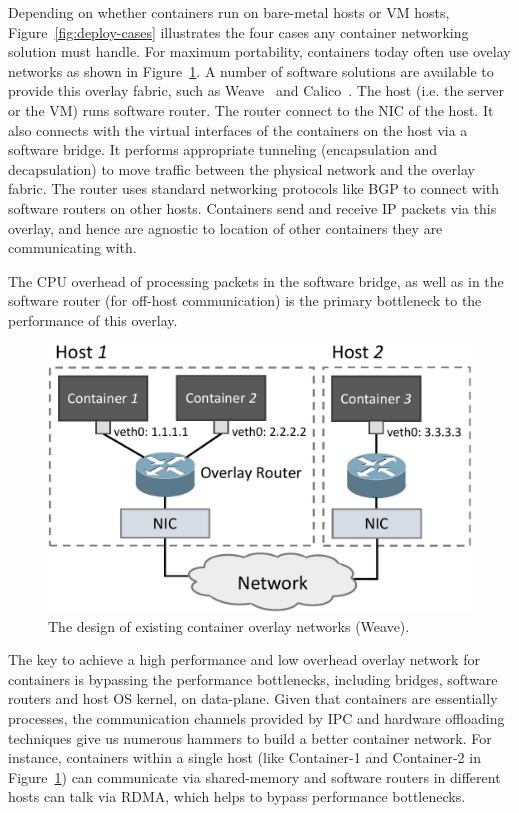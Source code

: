 Depending on whether containers run on bare-metal hosts or VM hosts,
Figure~\ref{fig:deploy-cases} illustrates the four cases any container
networking solution must handle. For maximum portability, containers today often
use ovelay networks as shown in Figure~\ref{fig:overlay}. A number of software
solutions are available to provide this overlay fabric, such as 
Weave~\cite{wave} and Calico~\cite{calico}. The host (i.e. the server or the VM)
runs software router. The router connect to the NIC of the host. It also
connects with the virtual interfaces of the containers on the host via a
software bridge. It performs appropriate tunneling (encapsulation and
decapsulation) to move traffic between the physical network and the overlay
fabric. The router uses standard networking protocols like BGP to connect with
software routers on other hosts. Containers send and receive IP packets via this
overlay, and hence are agnostic to location of other containers they are
communicating with.

The CPU overhead of processing packets in the software bridge, as well as in the
software router (for off-host communication) is the primary bottleneck to the
performance of this overlay.

\begin{figure}  
	\centering   
	\includegraphics[width=0.8\linewidth]{figures/overlay-2.pdf}   
	\caption{\label{fig:overlay} The design of existing container overlay networks (Weave).}   
\end{figure}   

The key to achieve a high performance and low overhead overlay network for
containers is bypassing the performance bottlenecks, including bridges, software
routers and host OS kernel, on data-plane. Given that containers are essentially
processes, the communication channels provided by IPC and hardware offloading
techniques give us numerous hammers to build a better container network. For
instance, containers within a single host (like Container-1 and Container-2 in
Figure~\ref{fig:overlay}) can communicate via shared-memory and software routers
in different hosts can talk via RDMA, which helps to bypass performance
bottlenecks.

